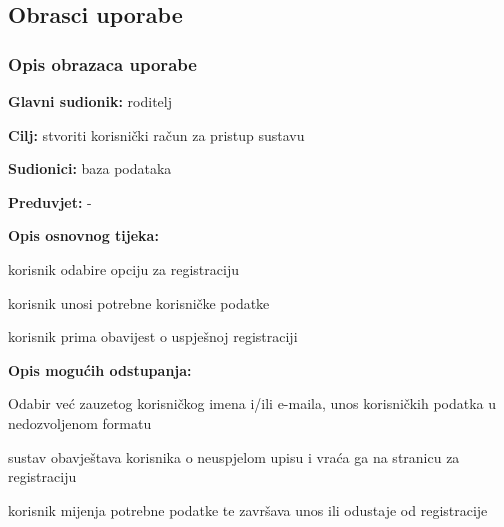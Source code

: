 			\eject 
			
			
				
			\subsection{Obrasci uporabe}
				
				
				\subsubsection{Opis obrazaca uporabe}
					

					\noindent {}
					\begin{packed_item}
	
						\item \textbf{Glavni sudionik: }roditelj
						\item  \textbf{Cilj:} stvoriti korisnički račun za pristup sustavu
						\item  \textbf{Sudionici:} baza podataka
						\item  \textbf{Preduvjet:} -
						\item  \textbf{Opis osnovnog tijeka:}
						
						\item[] \begin{packed_enum}
	
							\item korisnik odabire opciju za registraciju
							\item korisnik unosi potrebne korisničke podatke
							\item korisnik prima obavijest o uspješnoj registraciji

						\end{packed_enum}
						
						\item  \textbf{Opis mogućih odstupanja:}
						
						\item[] \begin{packed_item}
	
							\item[2.a] Odabir već zauzetog korisničkog imena i/ili e-maila, unos korisničkih podatka u nedozvoljenom formatu
							\item[] \begin{packed_enum}
								
								\item sustav obavještava korisnika o neuspjelom upisu i vraća ga na stranicu za registraciju
								\item korisnik mijenja potrebne podatke te završava unos ili odustaje od registracije
							\end{packed_enum}
							
						\end{packed_item}
					\end{packed_item}

